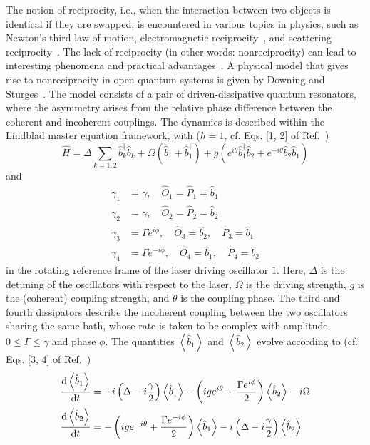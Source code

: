 \documentclass[onecolumn, 12pt, sort&compress]{elsarticle}
\newcounter{bla}
\newcommand{\expval}[1]{\left\langle{#1}\right\rangle}
\newcommand{\bop}{\hat{b}}
\newcommand{\bdag}{\bop^\dagger}
\begin{document}
The notion of reciprocity, i.e., when the interaction between two objects is identical if they are swapped, is encountered in various topics in physics, such as Newton's third law of motion, electromagnetic reciprocity~\cite{Caloz2018}, and scattering reciprocity~\cite{Dek2012}. The lack of reciprocity (in other words: nonreciprocity) can lead to interesting phenomena and practical advantages~\cite{Downing2022}. A physical model that gives rise to nonreciprocity in open quantum systems is given by Downing and Sturges~\cite{Downing2022}. The model consists of a pair of driven-dissipative quantum resonators, where the asymmetry arises from the relative phase difference between the coherent and incoherent couplings. The dynamics is described within the Lindblad master equation framework, with ($\hbar=1$, cf. Eqs. [1, 2] of Ref.~\cite{Downing2022})
\begin{equation}
    \hat{H} = \Delta\sum_{k=1,2}\bdag_k\bop_k + \Omega\left(\bop_1+\bdag_1\right) + g\left(e^{i\theta}\bdag_1\bop_2 + e^{-i\theta}\bdag_2\bop_1\right) 
\end{equation}
and
\begin{subequations}
\begin{align}
    \gamma_1 &= \gamma, \quad \hat{O}_1=\hat{P}_1=\bop_1
    \\
    \gamma_2 &= \gamma, \quad \hat{O}_2=\hat{P}_2=\bop_2
    \\
    \gamma_3 &= \Gamma e^{i\phi}, \quad \hat{O}_3=\bop_2,\quad \hat{P}_3=\bop_1
    \\
    \gamma_4 &= \Gamma e^{-i\phi}, \quad \hat{O}_4 = \bop_1,\quad \hat{P}_4 = \bop_2
\end{align}
\end{subequations}
in the rotating reference frame of the laser driving oscillator $1$. Here, $\Delta$ is the detuning of the oscillators with respect to the laser, $\Omega$ is the driving strength, $g$ is the (coherent) coupling strength, and $\theta$ is the coupling phase.  The third and fourth dissipators describe the incoherent coupling between the two oscillators sharing the same bath, whose rate is taken to be complex with amplitude $0\leq \Gamma\leq \gamma$ and phase $\phi$.  The quantities $\expval{\bop_1}$ and $\expval{\bop_2}$ evolve according to (cf. Eqs. [3, 4] of Ref.~\cite{Downing2022})
\begin{subequations}
\begin{align}
        \odv{\expval{\bop_1}}{t} &=
    -i\left(\Delta -i \frac{\gamma}{2}\right)\expval{\bop_1}-\left(ige^{i\theta}+\frac{\Gamma e^{i\phi}}{2}\right)\expval{\bop_2}-i\Omega \label{eq:ex5_1}
    \\
    \odv{\expval{\bop_2}}{t} &=
    -\left(ige^{-i\theta}+\frac{\Gamma e^{-i\phi}}{2}\right)\expval{\bop_1}-i\left(\Delta-i\frac{\gamma}{2}\right)\expval{\bop_2}\label{eq:ex5_2}
\end{align}
\end{subequations}
\end{document}
